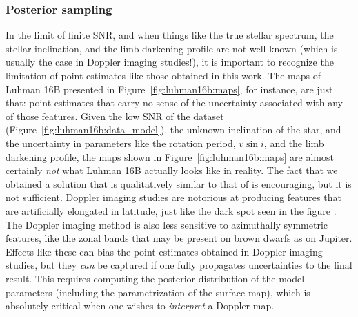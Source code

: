\documentclass[modern]{aastex631}
\begin{document}
\subsubsection{Posterior sampling}
\label{sec:discussion:priors:mcmc}
%
In the limit of finite SNR, and when things like the true stellar spectrum, the stellar inclination, and the limb darkening profile are not well known (which is usually the case in Doppler imaging studies!), it is important to recognize the limitation of point estimates like those obtained in this work.
The maps of Luhman 16B presented in Figure~\ref{fig:luhman16b:maps}, for instance, are just that: point estimates that carry no sense of the uncertainty associated with any of those features.
Given the low SNR of the dataset (Figure~\ref{fig:luhman16b:data_model}), the unknown inclination of the star, and the uncertainty in parameters like the rotation period, $v\sin i$, and the limb darkening profile, the maps shown in Figure~\ref{fig:luhman16b:maps} are almost certainly \emph{not} what Luhman 16B actually looks like in reality.
The fact that we obtained a solution that is qualitatively similar to that of \citet{Crossfield2014} is encouraging, but it is not sufficient.
Doppler imaging studies are notorious at producing features that are artificially elongated in latitude, just like the dark spot seen in the figure \citep[see, e.g.,][]{Unruh1995}.
The Doppler imaging method is also less sensitive to azimuthally symmetric features, like the zonal bands that may be present on brown dwarfs as on Jupiter.
Effects like these can bias the point estimates obtained in Doppler imaging studies, but they \emph{can} be captured if one fully propagates uncertainties to the final result.
This requires computing the posterior distribution of the model parameters (including the parametrization of the surface map), which is absolutely critical when one wishes to \emph{interpret} a Doppler map.
\end{document}
